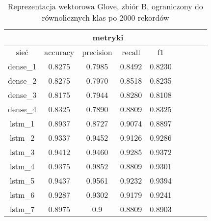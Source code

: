 \begin{table}[h] \label{tab:wyniki_glove_B_lim} \centering
    \caption{Reprezentacja wektorowa Glove, zbiór B, ograniczony do równolicznych klas po 2000 rekordów}
    \label{tab:wyniki_25_eks3}
    \begin{tabular} {|c|c|c|c|c|c|c|c|c| }    \hline
                 & \multicolumn{4}{c|}{metryki}                                                                                        \\ \hline
        sieć     & accuracy                     & precision                  & recall                     & f1                         \\ \hline
        dense\_1 & 0.8275                       & 0.7985                     & 0.8492                     & 0.8230                     \\ \hline
        dense\_2 & 0.8275                       & 0.7970                     & 0.8518                     & 0.8235                     \\ \hline
        dense\_3 & 0.8175                       & 0.7944                     & 0.8280                     & 0.8108                     \\ \hline
        dense\_4 & 0.8325                       & 0.7890                     & 0.8809                     & 0.8325                     \\ \hline
        lstm\_1  & 0.8937                       & 0.8727                     & 0.9074                     & 0.8897                     \\ \hline
        lstm\_2  & 0.9337                       & 0.9452                     & 0.9126                     & 0.9286                     \\ \hline
        lstm\_3  & 0.9412                       & 0.9460                     & 0.9285                     & 0.9372                     \\ \hline
        lstm\_4  & 0.9375                       & 0.9852                     & 0.8809                     & 0.9301                     \\ \hline
        lstm\_5  & 0.9437                       & 0.9561                     & 0.9232                     & 0.9394                     \\ \hline
        lstm\_6  & 0.9287                       & 0.9302                     & 0.9179                     & 0.9241                     \\ \hline
        lstm\_7  & 0.8975                       & 0.9                        & 0.8809                     & 0.8903                     \\ \hline

\end{tabular}
\end{table}
